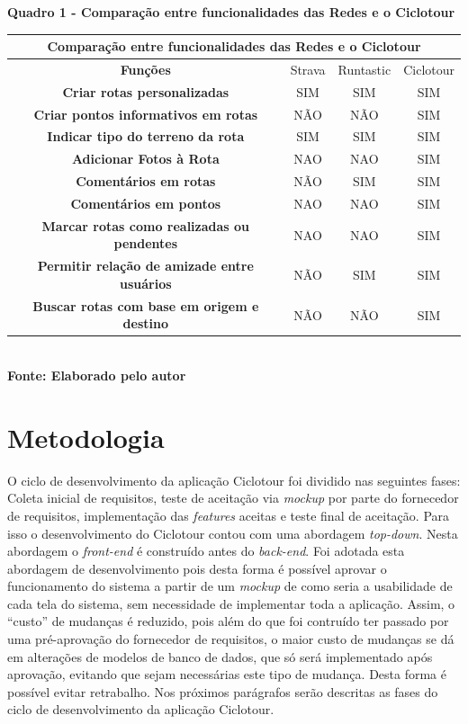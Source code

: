    \begin{center}
          \centering
       	\textbf{Quadro 1 - Comparação entre funcionalidades das Redes e o Ciclotour}\\
        \label{quadro1}
	\begin{tabular}{|c|c|c|c|} \hline
	\multicolumn{4}{|c|}{\textbf{Comparação entre funcionalidades das Redes e o Ciclotour }} 	  \\
		\hline \textbf{ Funções } & Strava & Runtastic & Ciclotour \\  
		\hline \textbf{ Criar rotas personalizadas } & SIM & SIM & SIM \\ 
		\hline \textbf{ Criar pontos informativos em rotas } & NÃO & NÃO & SIM  \\
		\hline \textbf{ Indicar tipo do terreno da rota } & SIM & SIM & SIM \\ 
		\hline \textbf{	Adicionar Fotos à Rota } & NAO & NAO & SIM \\ 
		\hline \textbf{ Comentários em rotas }	& NÃO & SIM & SIM \\ 
		\hline \textbf{	Comentários em pontos } & NAO & NAO & SIM \\ 
		\hline \textbf{	Marcar rotas como realizadas ou pendentes } & NAO & NAO & SIM \\ 
		\hline \textbf{	Permitir relação de amizade entre usuários } & NÃO & SIM & SIM \\ 
		\hline \textbf{	Buscar rotas com base em origem e destino } & NÃO & NÃO & SIM \\ 
		\hline
	\end{tabular}
	\vspace{0.1cm} 
	{\footnotesize\\ \textbf{Fonte: Elaborado pelo autor}}
   \end{center}

\section{Metodologia}
O ciclo de desenvolvimento da aplicação Ciclotour foi dividido nas seguintes fases: Coleta inicial de requisitos, teste de aceitação via 
\textit{mockup} por parte do fornecedor de requisitos, implementação das \textit{features} aceitas e teste final de aceitação. Para isso 
o desenvolvimento do Ciclotour contou com uma abordagem \textit{top-down}. Nesta abordagem o \textit{front-end} é construído antes do 
\textit{back-end}. Foi adotada esta abordagem de desenvolvimento pois desta forma é possível aprovar o funcionamento do sistema a partir de um 
\textit{mockup} de como seria a usabilidade de cada tela do sistema, sem necessidade de implementar toda a aplicação. Assim, o ``custo'' de mudanças 
é reduzido, pois além do que foi contruído ter passado por uma pré-aprovação do fornecedor de requisitos, o maior custo de mudanças se dá em 
alterações de modelos de banco de dados, que só será implementado após aprovação, evitando que sejam necessárias este tipo de mudança. Desta forma é 
possível evitar retrabalho. Nos próximos parágrafos serão descritas as fases do ciclo de desenvolvimento da aplicação Ciclotour.


